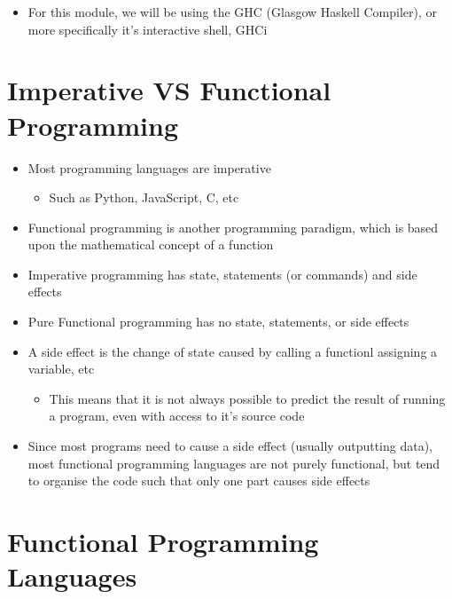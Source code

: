 
\begin{itemize}
  \item For this module, we will be using the GHC (Glasgow Haskell Compiler), or more specifically it's interactive shell, GHCi
\end{itemize}

\section*{Imperative VS Functional Programming}

\begin{itemize}
  \item Most programming languages are imperative
  \begin{itemize}
    \item Such as Python, JavaScript, C, etc
  \end{itemize}
  \item Functional programming is another programming paradigm, which is based upon the mathematical concept of a function
  \item Imperative programming has state, statements (or commands) and side effects
  \item Pure Functional programming has no state, statements, or side effects
  \item A side effect is the change of state caused by calling a functionl assigning a variable, etc
  \begin{itemize}
    \item This means that it is not always possible to predict the result of running a program, even with access to it's
    source code
  \end{itemize}
\end{itemize}

\begin{itemize}
  \item Since most programs need to cause a side effect (usually outputting data), most functional programming languages are
  not purely functional, but tend to organise the code such that only one part causes side effects
\end{itemize}

\section*{Functional Programming Languages}

